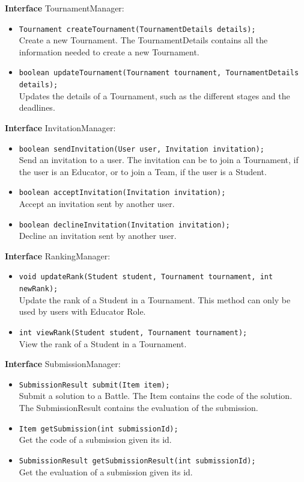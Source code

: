 \textbf{Interface} TournamentManager:
\begin{itemize}
    \item \texttt{Tournament createTournament(TournamentDetails details);}
    \\ Create a new Tournament. The TournamentDetails contains all the information needed to create a new Tournament.
    \item \texttt{boolean updateTournament(Tournament tournament, TournamentDetails details);}
    \\ Updates the details of a Tournament, such as the different stages and the deadlines.
\end{itemize}

\textbf{Interface} InvitationManager:
\begin{itemize}
    \item \texttt{boolean sendInvitation(User user, Invitation invitation);}
    \\ Send an invitation to a user. The invitation can be to join a Tournament, if the user is an Educator, or to join a Team, if the user is a Student.
    \item \texttt{boolean acceptInvitation(Invitation invitation);}
    \\ Accept an invitation sent by another user.
    \item \texttt{boolean declineInvitation(Invitation invitation);}
    \\ Decline an invitation sent by another user.
\end{itemize}

\textbf{Interface} RankingManager:
\begin{itemize}
    \item \texttt{void updateRank(Student student, Tournament tournament, int newRank);}
    \\ Update the rank of a Student in a Tournament. This method can only be used by users with Educator Role.
    \item \texttt{int viewRank(Student student, Tournament tournament);}
    \\ View the rank of a Student in a Tournament.
\end{itemize}

\textbf{Interface} SubmissionManager:
\begin{itemize}
    \item \texttt{SubmissionResult submit(Item item);}
    \\ Submit a solution to a Battle. The Item contains the code of the solution. The SubmissionResult contains the evaluation of the submission.
    \item \texttt{Item getSubmission(int submissionId);}
    \\ Get the code of a submission given its id.
    \item \texttt{SubmissionResult getSubmissionResult(int submissionId);}
    \\ Get the evaluation of a submission given its id.
\end{itemize}

